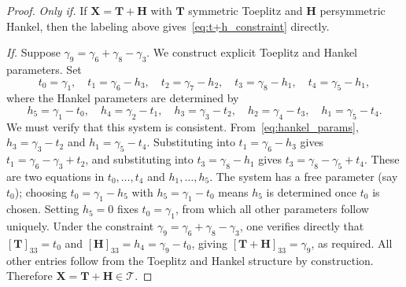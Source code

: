 \documentclass{siamart251216}
\def\bH{\mathbf{H}}
\def\bT{\mathbf{T}}
\def\bX{\mathbf{X}}
\begin{document}
\begin{proof}
\emph{Only if.}  If $\bX = \bT+\bH$ with $\bT$ symmetric Toeplitz and $\bH$ persymmetric
Hankel, then the labeling above gives~\eqref{eq:t+h_constraint} directly.

\emph{If.}  Suppose $\gamma_9 = \gamma_6 + \gamma_8 - \gamma_3$.  We construct explicit
Toeplitz and Hankel parameters.  Set
\begin{equation}
\label{eq:toeplitz_params}
    t_0 = \gamma_1,\quad t_1 = \gamma_6 - h_3,\quad t_2 = \gamma_7 - h_2,\quad
    t_3 = \gamma_8 - h_1,\quad t_4 = \gamma_5 - h_1,
\end{equation}
where the Hankel parameters are determined by
\begin{equation}
\label{eq:hankel_params}
    h_5 = \gamma_1 - t_0,\quad h_4 = \gamma_2 - t_1,\quad h_3 = \gamma_3 - t_2,\quad
    h_2 = \gamma_4 - t_3,\quad h_1 = \gamma_5 - t_4.
\end{equation}
We must verify that this system is consistent.  From~\eqref{eq:hankel_params}, $h_3 = \gamma_3
- t_2$ and $h_1 = \gamma_5 - t_4$.  Substituting into $t_1 = \gamma_6 - h_3$ gives
$t_1 = \gamma_6 - \gamma_3 + t_2$, and substituting into $t_3 = \gamma_8 - h_1$ gives
$t_3 = \gamma_8 - \gamma_5 + t_4$.  These are two equations in $t_0,\dots,t_4$ and
$h_1,\dots,h_5$.  The system has a free parameter (say $t_0$); choosing $t_0 = \gamma_1 - h_5$
with $h_5 = \gamma_1 - t_0$ means $h_5$ is determined once $t_0$ is chosen.  Setting
$h_5 = 0$ fixes $t_0 = \gamma_1$, from which all other parameters follow uniquely.  Under the
constraint $\gamma_9 = \gamma_6 + \gamma_8 - \gamma_3$, one verifies directly that
$[\bT]_{33} = t_0$ and $[\bH]_{33} = h_4 = \gamma_9 - t_0$, giving $[\bT+\bH]_{33} = \gamma_9$,
as required.  All other entries follow from the Toeplitz and Hankel structure by
construction.  Therefore $\bX = \bT + \bH\in\mathscr{T}$.
\end{proof}



\end{document}
